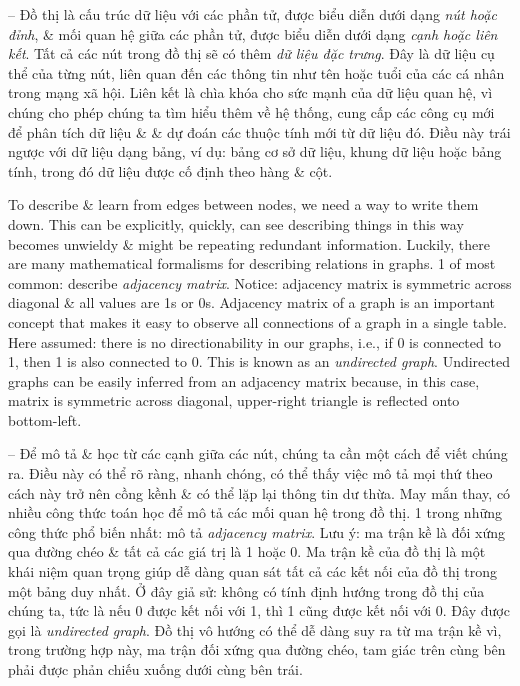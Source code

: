 \documentclass{article}
\begin{document}
\begin{itemize}
\begin{itemize}
\begin{itemize}
            -- Đồ thị là cấu trúc dữ liệu với các phần tử, được biểu diễn dưới dạng {\it nút hoặc đỉnh}, \& mối quan hệ giữa các phần tử, được biểu diễn dưới dạng {\it cạnh hoặc liên kết}. Tất cả các nút trong đồ thị sẽ có thêm {\it dữ liệu đặc trưng}. Đây là dữ liệu cụ thể của từng nút, liên quan đến các thông tin như tên hoặc tuổi của các cá nhân trong mạng xã hội. Liên kết là chìa khóa cho sức mạnh của dữ liệu quan hệ, vì chúng cho phép chúng ta tìm hiểu thêm về hệ thống, cung cấp các công cụ mới để phân tích dữ liệu \& \& dự đoán các thuộc tính mới từ dữ liệu đó. Điều này trái ngược với dữ liệu dạng bảng, ví dụ: bảng cơ sở dữ liệu, khung dữ liệu hoặc bảng tính, trong đó dữ liệu được cố định theo hàng \& cột.

            To describe \& learn from edges between nodes, we need a way to write them down. This can be explicitly, quickly, can see describing things in this way becomes unwieldy \& might be repeating redundant information. Luckily, there are many mathematical formalisms for describing relations in graphs. 1 of most common: describe {\it adjacency matrix}. Notice: adjacency matrix is symmetric across diagonal \& all values are 1s or 0s. Adjacency matrix of a graph is an important concept that makes it easy to observe all connections of a graph in a single table. Here assumed: there is no directionability in our graphs, i.e., if 0 is connected to 1, then 1 is also connected to 0. This is known as an {\it undirected graph}. Undirected graphs can be easily inferred from an adjacency matrix because, in this case, matrix is symmetric across diagonal, upper-right triangle is reflected onto bottom-left.

            -- Để mô tả \& học từ các cạnh giữa các nút, chúng ta cần một cách để viết chúng ra. Điều này có thể rõ ràng, nhanh chóng, có thể thấy việc mô tả mọi thứ theo cách này trở nên cồng kềnh \& có thể lặp lại thông tin dư thừa. May mắn thay, có nhiều công thức toán học để mô tả các mối quan hệ trong đồ thị. 1 trong những công thức phổ biến nhất: mô tả {\it adjacency matrix}. Lưu ý: ma trận kề là đối xứng qua đường chéo \& tất cả các giá trị là 1 hoặc 0. Ma trận kề của đồ thị là một khái niệm quan trọng giúp dễ dàng quan sát tất cả các kết nối của đồ thị trong một bảng duy nhất. Ở đây giả sử: không có tính định hướng trong đồ thị của chúng ta, tức là nếu 0 được kết nối với 1, thì 1 cũng được kết nối với 0. Đây được gọi là {\it undirected graph}. Đồ thị vô hướng có thể dễ dàng suy ra từ ma trận kề vì, trong trường hợp này, ma trận đối xứng qua đường chéo, tam giác trên cùng bên phải được phản chiếu xuống dưới cùng bên trái.


\end{itemize}
\end{itemize}
\end{itemize}
\end{document}
